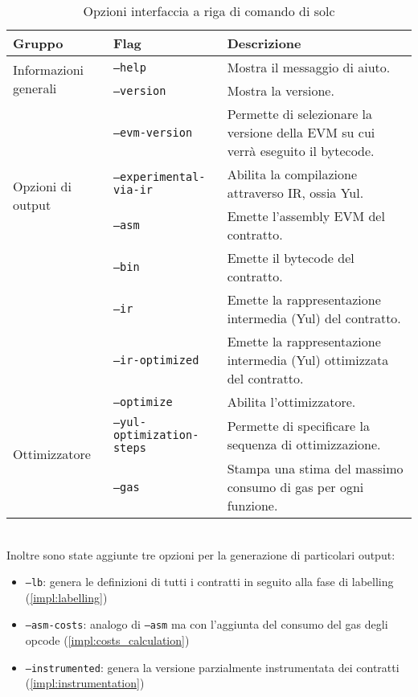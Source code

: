 \documentclass[12pt,a4paper,openright,oneside]{report}
\theoremstyle{definition}
\begin{document}
\begin{table}[h]
\centering
\begin{tabular}{ |m{6em}|m{7em}|m{18em}| }
    \hline
    \textbf{Gruppo} & \textbf{Flag} & \textbf{Descrizione}\\
    \hline
    \multirow{2}{6em}{Informazioni generali} & \texttt{--help} & Mostra il messaggio di aiuto.\\\cline{2-3}
    & \texttt{--version}   &   Mostra la versione.\\
    \hline
    \multirow{4}{6em}{Opzioni di output} & \texttt{--evm-version} & Permette di selezionare la versione della EVM su cui verr\`{a} eseguito il bytecode.\\\cline{2-3}
    & \texttt{--experimen\-tal-via-ir}   &   Abilita la compilazione attraverso IR, ossia Yul.\\
    \hline
    \multirow{6}{6em}{Componenti di output} & \texttt{--asm} & Emette l'assembly EVM del contratto.\\\cline{2-3}
    & \texttt{--bin}   &   Emette il bytecode del contratto.\\\cline{2-3}
    & \texttt{--ir}   &   Emette la rappresentazione intermedia (Yul) del contratto.\\\cline{2-3}
    & \texttt{--ir-optimized}   &   Emette la rappresentazione intermedia (Yul) ottimizzata del contratto.\\
    \hline
    \multirow{3}{6em}{Ottimizzatore} & \texttt{--optimize} & Abilita l'ottimizzatore.\\\cline{2-3}
    & \texttt{--yul-optimi\-zation-steps}   &   Permette di specificare la sequenza di ottimizzazione.\\
    \hline
    Output aggiuntivo & \texttt{--gas} & Stampa una stima del massimo consumo di gas per ogni funzione.\\
    \hline
\end{tabular}
\caption{Opzioni interfaccia a riga di comando di solc}
\label{table:solc:options}
\end{table}
\\Inoltre sono state aggiunte tre opzioni per la generazione di particolari output:
\begin{itemize}
    \item \texttt{--lb}: genera le definizioni di tutti i contratti in seguito alla fase di labelling (\ref{impl:labelling})
    \item \texttt{--asm-costs}: analogo di \texttt{--asm} ma con l'aggiunta del consumo del gas degli opcode (\ref{impl:costs_calculation})
    \item \texttt{--instrumented}: genera la versione parzialmente instrumentata dei contratti (\ref{impl:instrumentation})
\end{itemize}
\end{document}
